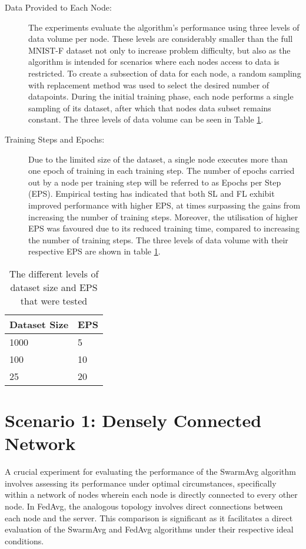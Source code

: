 \begin{description}
	\item [Data Provided to Each Node:] The experiments evaluate the algorithm's performance using three levels of data volume per node. These levels are considerably smaller than the full MNIST-F dataset not only to increase problem difficulty, but also as the algorithm is intended for scenarios where each nodes access to data is restricted. To create a subsection of data for each node, a random sampling with replacement method was used to select the desired number of datapoints. During the initial training phase, each node performs a single sampling of its dataset, after which that nodes data subset remains constant. The three levels of data volume can be seen in Table \ref{epsparams}.
	
	\item [Training Steps and Epochs:] Due to the limited size of the dataset, a single node executes more than one epoch of training in each training step. The number of epochs carried out by a node per training step will be referred to as Epochs per Step (EPS). Empirical testing has indicated that both SL and FL exhibit improved performance with higher EPS, at times surpassing the gains from increasing the number of training steps. Moreover, the utilisation of higher EPS was favoured due to its reduced training time, compared to increasing the number of training steps. The three levels of data volume with their respective EPS are shown in table \ref{epsparams}.
	
\end{description}

\begin{table}[H]
	\centering
	\begin{tabular}{l|l}
		Dataset Size & EPS \\ \hline \hline
		1000   & 5  \\ \hline
		100   & 10  \\ \hline
		25  & 20 
	\end{tabular}
	\caption{The different levels of dataset size and EPS that were tested} \label{epsparams}
\end{table}

\section{Scenario 1: Densely Connected Network}
A crucial experiment for evaluating the performance of the SwarmAvg algorithm involves assessing its performance under optimal circumstances, specifically within a network of nodes wherein each node is directly connected to every other node. In FedAvg, the analogous topology involves direct connections between each node and the server. This comparison is significant as it facilitates a direct evaluation of the SwarmAvg and FedAvg algorithms under their respective ideal conditions.

